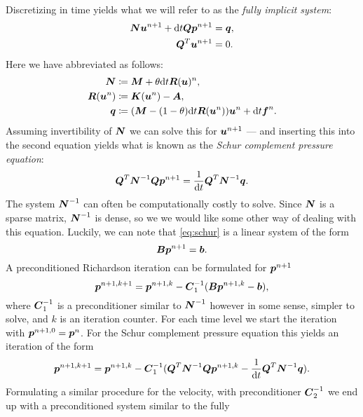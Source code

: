 Discretizing in time yields what we will refer to as the \emph{fully implicit
system}:
\begin{align}
    \boldsymbol{N}\boldsymbol{u}^{n+1} + \mathrm{d} t \boldsymbol{Q}\boldsymbol{p}^{n+1} &= \boldsymbol{q}, \\
    \boldsymbol{Q}^T\boldsymbol{u}^{n+1} &= 0.
\end{align}
Here we have abbreviated as follows:
\begin{align}
    \boldsymbol{N} &\coloneqq \boldsymbol{M} + \theta \mathrm{d} t \boldsymbol{R}(\boldsymbol{u})^{n}, \\
    \boldsymbol{R}(\boldsymbol{u}^n) &\coloneqq \boldsymbol{K}(\boldsymbol{u}^n) - \boldsymbol{A}, \\
    \boldsymbol{q} &\coloneqq (\boldsymbol{M} - (1- \theta)\mathrm{d} t \boldsymbol{R}(\boldsymbol{u}^n))\boldsymbol{u}^n + \mathrm{d} t \boldsymbol{f}^{n}.
\end{align}
Assuming invertibility of \( \boldsymbol{N} \) we can solve this for \( \boldsymbol{u}^{n+1} \)
--- and inserting this into the second equation yields what is known as the
\emph{Schur complement pressure equation}:
\begin{align}
    \label{eq:schur}
    \boldsymbol{Q}^T\boldsymbol{N}^{-1}\boldsymbol{Q}\boldsymbol{p}^{n+1} = \frac{1}{\mathrm{d} t}\boldsymbol{Q}^T\boldsymbol{N}^{-1}\boldsymbol{q}.
\end{align}
The system \( \boldsymbol{N}^{-1} \) can often be computationally costly to solve.
Since \( \boldsymbol{N} \) is a sparse matrix, \(\boldsymbol{N}^{-1}\) is dense, so we we
would like some other way of dealing with this equation.  Luckily, we can note
that \cref{eq:schur} is a linear system of the form
\begin{equation}
    \boldsymbol{B} \boldsymbol{p}^{n+1} = \boldsymbol{b}.
\end{equation}
A preconditioned Richardson iteration can be formulated for \( \boldsymbol{p}^{n+1} \)
\begin{equation}
    \boldsymbol{p}^{n+1, k+1} = \boldsymbol{p}^{n+1, k} - \boldsymbol{C}_1^{-1}(\boldsymbol{B}\boldsymbol{p}^{n+1, k} - \boldsymbol{b}),
\end{equation}
where \(\boldsymbol{C}_1^{-1}\) is a preconditioner similar to \(\boldsymbol{N}^{-1}\)
however in some sense, simpler to solve, and \( k \) is an iteration counter.
For each time level we start the iteration with \( \boldsymbol{p}^{n+1, 0} = \boldsymbol{p}^n
\). For the Schur complement pressure equation this yields an iteration of the
form
\begin{equation}
    \boldsymbol{p}^{n+1, k+1} = \boldsymbol{p}^{n+1, k} - \boldsymbol{C}_1^{-1}(\boldsymbol{Q}^T\boldsymbol{N}^{-1}\boldsymbol{Q}\boldsymbol{p}^{n+1, k} - \frac{1}{\mathrm{d} t}\boldsymbol{Q}^T \boldsymbol{N}^{-1} \boldsymbol{q}).
\end{equation}
Formulating a similar procedure for the velocity, with preconditioner
\(\boldsymbol{C}_2^{-1}\) we end up with a preconditioned system similar to the fully
